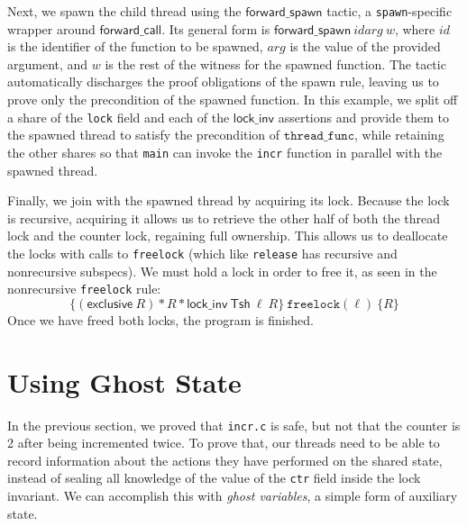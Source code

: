 \documentclass[11pt]{article}
\begin{document}
Next, we spawn the child thread using the $\mathsf{forward\_spawn}$ tactic, a \texttt{spawn}-specific wrapper around $\mathsf{forward\_call}$. Its general form is $\mathsf{forward\_spawn}\ \mathit{id} \mathit{arg}\ \mathit{w}$, where $\mathit{id}$ is the identifier of the function to be spawned, $\mathit{arg}$ is the value of the provided argument, and $\mathit{w}$ is the rest of the witness for the spawned function. The tactic automatically discharges the proof obligations of the spawn rule, leaving us to prove only the precondition of the spawned function. In this example, we split off a share of the \texttt{lock} field and each of the $\mathsf{lock\_inv}$ assertions and provide them to the spawned thread to satisfy the precondition of $\mathtt{thread\_func}$, while retaining the other shares so that \texttt{main} can invoke the \texttt{incr} function in parallel with the spawned thread.

Finally, we join with the spawned thread by acquiring its lock. Because the lock is recursive, acquiring it allows us to retrieve the other half of both the thread lock and the counter lock, regaining full ownership. This allows us to deallocate the locks with calls to \texttt{freelock} (which like \texttt{release} has recursive and nonrecursive subspecs). We must hold a lock in order to free it, as seen in the nonrecursive \texttt{freelock} rule:
$$\{(\mathsf{exclusive}\ R) * R * \mathsf{lock\_inv}\ \mathsf{Tsh}\ \ell\ R\}\ \texttt{freelock}(\ell)\ \{R\}$$
Once we have freed both locks, the program is finished.

\section{Using Ghost State}
\label{ghost}
In the previous section, we proved that \texttt{incr.c} is safe, but not that the counter is 2 after being incremented twice. To prove that, our threads need to be able to record information about the actions they have performed on the shared state, instead of sealing all knowledge of the value of the \texttt{ctr} field inside the lock invariant. We can accomplish this with \emph{ghost variables}, a simple form of auxiliary state.
\end{document}
